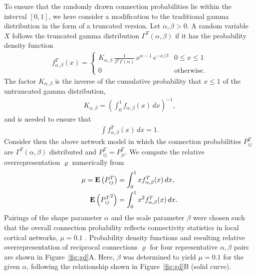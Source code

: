 To ensure that the randomly drawn connection probabilities lie within the
interval $[0,1]$, we here consider a modification to the
traditional gamma distribution in the form of a truncated version. Let
$\alpha, \beta > 0$. A random variable $X$ follows the truncated gamma
distribution $\Gamma^T(\alpha, \beta)$ if it has the probability
density function
%
\begin{align}
  f_{\alpha,\beta}^T(x) = \begin{cases} K_{\alpha, \beta}\,
\frac{1}{\beta^{\alpha}\Gamma(\alpha)}\, x^{\alpha-1}\,e^{-x/\beta} & 0 \leq x \leq 1 \\
0 & \text{otherwise}.
\end{cases} \label{eq:fTab}
\end{align}
%
The factor $K_{\alpha,\beta}$ is the inverse of the cumulative
probability that $x \leq 1$ of the untruncated gamma distribution,
\begin{align}
  K_{\alpha,\beta} = \left(\int_0^{1} f_{\alpha,\beta}(x) \, dx \right)^{-1},
\end{align}
and is needed to ensure that
\begin{align}
  \int f_{\alpha,\beta}^T(x) \,dx = 1 \label{eq:gd1}.
\end{align}
Consider then the above network model in which the connection
probabilities $P_{ij}^T$ are $\Gamma^T(\alpha, \beta)$ distributed and $P_{ij}^T = P_{ji}^T$. We
compute the relative overrepresentation $\varrho$ numerically from
\begin{align}
  \mu = \operatorname{\mathbf{E}}\left(P_{ij}^T\right) &= \int_0^1 x f_{\alpha,\beta}^T(x)\, dx,\\
        \operatorname{\mathbf{E}}\left({P_{ij}^T}^2\right) &= \int_0^1 x^2 f_{\alpha,\beta}^T(x)\, dx.
\end{align}
%
Pairings of the shape parameter $\alpha$ and the scale parameter
$\beta$ were chosen such that the overall connection probability
reflects connectivity statistics in local cortical networks, $\mu =
0.1$ \cite{Song2005, Thomson2002}. Probability density functions and
resulting relative overrepresentation of reciprocal connections
$\varrho$ for four representative $\alpha,\beta$ pairs are shown in
Figure~\ref{fig:gd}A. Here, $\beta$ was determined to yield $\mu =
0.1$ for the given $\alpha$, following the relationship shown in
Figure~\ref{fig:gd}B (solid curve).



